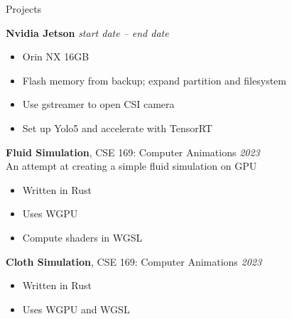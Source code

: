 	\begin{rSection}{Projects}


		{\bf Nvidia Jetson}{} \hfill {\em start date -- end date}
		\begin{multicols}{2}
			\begin{itemize}
				\item Orin NX 16GB
				\item Flash memory from backup; expand partition and filesystem
				\item Use gstreamer to open CSI camera
				\item Set up Yolo5 and accelerate with TensorRT
			\end{itemize}
		\end{multicols}

		{\bf Fluid Simulation}{, CSE 169: Computer Animations} \hfill {\em 2023} \\
		An attempt at creating a simple fluid simulation on GPU
		\begin{multicols}{2}
			\begin{itemize}
				\item Written in Rust
				\item Uses WGPU
				\item Compute shaders in WGSL
			\end{itemize}
		\end{multicols}

		{\bf Cloth Simulation}{, CSE 169: Computer Animations} \hfill {\em 2023}
		\begin{multicols}{2}
			\begin{itemize}
				\item Written in Rust
				\item Uses WGPU and WGSL
			\end{itemize}
		\end{multicols}


\end{rSection}
